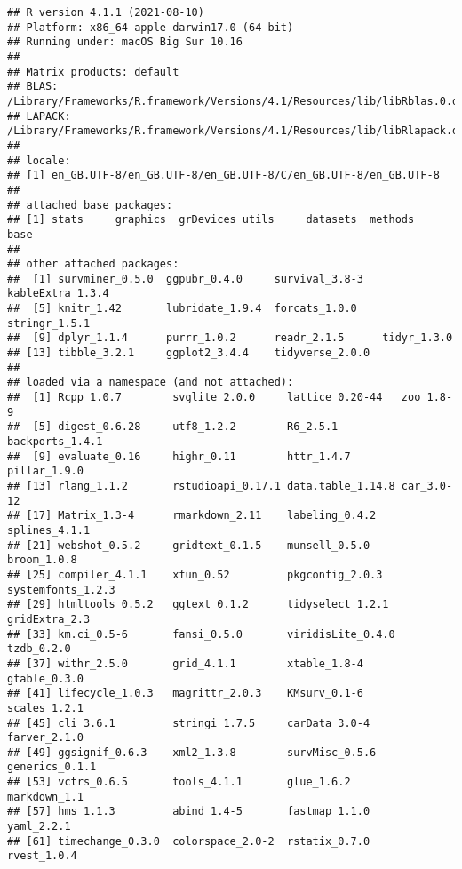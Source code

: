 \documentclass[
]{article}
\begin{document}
\begin{verbatim}
## R version 4.1.1 (2021-08-10)
## Platform: x86_64-apple-darwin17.0 (64-bit)
## Running under: macOS Big Sur 10.16
## 
## Matrix products: default
## BLAS:   /Library/Frameworks/R.framework/Versions/4.1/Resources/lib/libRblas.0.dylib
## LAPACK: /Library/Frameworks/R.framework/Versions/4.1/Resources/lib/libRlapack.dylib
## 
## locale:
## [1] en_GB.UTF-8/en_GB.UTF-8/en_GB.UTF-8/C/en_GB.UTF-8/en_GB.UTF-8
## 
## attached base packages:
## [1] stats     graphics  grDevices utils     datasets  methods   base     
## 
## other attached packages:
##  [1] survminer_0.5.0  ggpubr_0.4.0     survival_3.8-3   kableExtra_1.3.4
##  [5] knitr_1.42       lubridate_1.9.4  forcats_1.0.0    stringr_1.5.1   
##  [9] dplyr_1.1.4      purrr_1.0.2      readr_2.1.5      tidyr_1.3.0     
## [13] tibble_3.2.1     ggplot2_3.4.4    tidyverse_2.0.0 
## 
## loaded via a namespace (and not attached):
##  [1] Rcpp_1.0.7        svglite_2.0.0     lattice_0.20-44   zoo_1.8-9        
##  [5] digest_0.6.28     utf8_1.2.2        R6_2.5.1          backports_1.4.1  
##  [9] evaluate_0.16     highr_0.11        httr_1.4.7        pillar_1.9.0     
## [13] rlang_1.1.2       rstudioapi_0.17.1 data.table_1.14.8 car_3.0-12       
## [17] Matrix_1.3-4      rmarkdown_2.11    labeling_0.4.2    splines_4.1.1    
## [21] webshot_0.5.2     gridtext_0.1.5    munsell_0.5.0     broom_1.0.8      
## [25] compiler_4.1.1    xfun_0.52         pkgconfig_2.0.3   systemfonts_1.2.3
## [29] htmltools_0.5.2   ggtext_0.1.2      tidyselect_1.2.1  gridExtra_2.3    
## [33] km.ci_0.5-6       fansi_0.5.0       viridisLite_0.4.0 tzdb_0.2.0       
## [37] withr_2.5.0       grid_4.1.1        xtable_1.8-4      gtable_0.3.0     
## [41] lifecycle_1.0.3   magrittr_2.0.3    KMsurv_0.1-6      scales_1.2.1     
## [45] cli_3.6.1         stringi_1.7.5     carData_3.0-4     farver_2.1.0     
## [49] ggsignif_0.6.3    xml2_1.3.8        survMisc_0.5.6    generics_0.1.1   
## [53] vctrs_0.6.5       tools_4.1.1       glue_1.6.2        markdown_1.1     
## [57] hms_1.1.3         abind_1.4-5       fastmap_1.1.0     yaml_2.2.1       
## [61] timechange_0.3.0  colorspace_2.0-2  rstatix_0.7.0     rvest_1.0.4
\end{verbatim}
\end{document}
